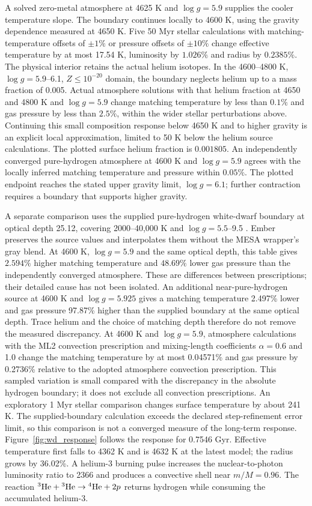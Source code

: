 \documentclass[11pt,letterpaper]{article}
\begin{document}
A solved zero-metal atmosphere at 4625 K and $\log g=5.9$ supplies the
cooler temperature slope. The boundary continues locally to 4600 K,
using the gravity dependence measured at 4650 K. Five 50 Myr stellar
calculations with matching-temperature offsets of $\pm1\%$ or pressure
offsets of $\pm10\%$ change effective temperature by at most 17.54 K,
luminosity by $1.026\%$ and radius by $0.2385\%$. The physical interior
retains the actual helium isotopes. In the 4600--4800 K,
$\log g=5.9$--6.1, $Z\leq10^{-20}$ domain, the boundary neglects helium
up to a mass fraction of 0.005. Actual atmosphere solutions with that
helium fraction at 4650 and 4800 K and $\log g=5.9$ change matching
temperature by less than $0.1\%$ and gas pressure by less than $2.5\%$,
within the wider stellar perturbations above. Continuing this small
composition response below 4650 K and to higher gravity is an explicit
local approximation, limited to 50 K below the helium source calculations.
The plotted surface helium fraction is $0.001805$.
An independently converged pure-hydrogen atmosphere at 4600 K and
$\log g=5.9$ agrees with the locally inferred matching temperature and
pressure within $0.05\%$. The plotted endpoint reaches the stated upper
gravity limit, $\log g=6.1$; further contraction requires a boundary that
supports higher gravity.

A separate comparison uses the supplied pure-hydrogen white-dwarf boundary
at optical depth 25.12, covering 2000--40,000 K and
$\log g=5.5$--9.5 \cite{mesa_atm}. Ember preserves the source values and
interpolates them without the MESA wrapper's gray blend. At 4600 K,
$\log g=5.9$ and the same optical depth, this table gives $2.594\%$
higher matching temperature and $48.69\%$ lower gas pressure than the
independently converged atmosphere. These are differences between
prescriptions; their detailed cause has not been isolated. An additional
near-pure-hydrogen source at 4600 K and $\log g=5.925$ gives a matching
temperature 2.497\% lower and gas pressure 97.87\% higher than the
supplied boundary at the same optical depth. Trace helium and the choice
of matching depth therefore do not remove the measured discrepancy.
At 4600 K and $\log g=5.9$, atmosphere calculations with the ML2
convection prescription and mixing-length coefficients $\alpha=0.6$ and
1.0 change the matching temperature by at most 0.04571\% and gas pressure
by 0.2736\% relative to the adopted atmosphere convection prescription.
This sampled variation is small compared with the discrepancy in the
absolute hydrogen boundary; it does not exclude all convection prescriptions.
An exploratory 1 Myr stellar comparison changes surface temperature by
about 241 K. The supplied-boundary calculation exceeds the declared
step-refinement error limit, so this comparison is not a converged measure
of the long-term response. Figure~\ref{fig:wd_response} follows the response for 0.7546 Gyr.
Effective temperature first falls to 4362 K and is 4632 K at the latest
model; the radius grows by 36.02\%. A helium-3 burning pulse increases
the nuclear-to-photon luminosity ratio to 2366 and produces a convective
shell near $m/M=0.96$. The reaction
$^3{\rm He}+{}^3{\rm He}\rightarrow{}^4{\rm He}+2p$ returns hydrogen
while consuming the accumulated helium-3.
\end{document}
